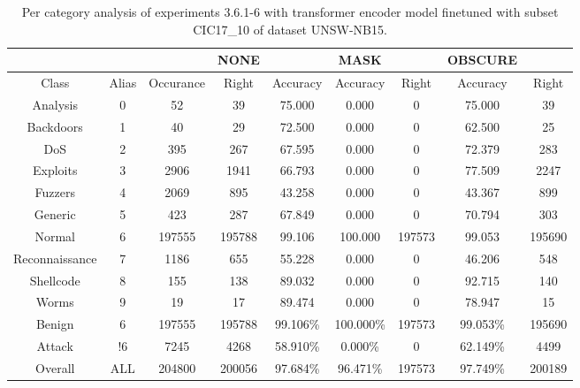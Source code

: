 \begin{table}[htb]
    \centering
    \begin{tabular}{@{}ccccccccc@{}}
        \toprule
         &  &  & NONE &  & MASK &  & OBSCURE &  \\
        \midrule
        Class &  Alias &  Occurance &  Right &  Accuracy &  Accuracy &  Right &  Accuracy &  Right \\
        Analysis &  0 &  52 &  39 &  75.000 &  0.000 &  0 &  75.000 &  39 \\
        Backdoors &  1 &  40 &  29 &  72.500 &  0.000 &  0 &  62.500 &  25 \\
        DoS &  2 &  395 &  267 &  67.595 &  0.000 &  0 &  72.379 &  283 \\
        Exploits &  3 &  2906 &  1941 &  66.793 &  0.000 &  0 &  77.509 &  2247 \\
        Fuzzers &  4 &  2069 &  895 &  43.258 &  0.000 &  0 &  43.367 &  899 \\
        Generic &  5 &  423 &  287 &  67.849 &  0.000 &  0 &  70.794 &  303 \\
        Normal &  6 &  197555 &  195788 &  99.106 &  100.000 &  197573 &  99.053 &  195690 \\
        Reconnaissance &  7 &  1186 &  655 &  55.228 &  0.000 &  0 &  46.206 &  548 \\
        Shellcode &  8 &  155 &  138 &  89.032 &  0.000 &  0 &  92.715 &  140 \\
        Worms &  9 &  19 &  17 &  89.474 &  0.000 &  0 &  78.947 &  15 \\
        Benign &  6 &  197555 &  195788 &  99.106\% &  100.000\% &  197573 &  99.053\% &  195690 \\
        Attack &  !6 &  7245 &  4268 &  58.910\% &  0.000\% &  0 &  62.149\% &  4499 \\
        Overall &  ALL &  204800 &  200056 &  97.684\% &  96.471\% &  197573 &  97.749\% &  200189 \\
        \bottomrule
    \end{tabular}
    \caption{Per category analysis of experiments 3.6.1-6 with transformer encoder model finetuned with subset CIC17\_10 of dataset UNSW-NB15.}
    \label{table:results:lstm:class_flows15_subset}
\end{table}